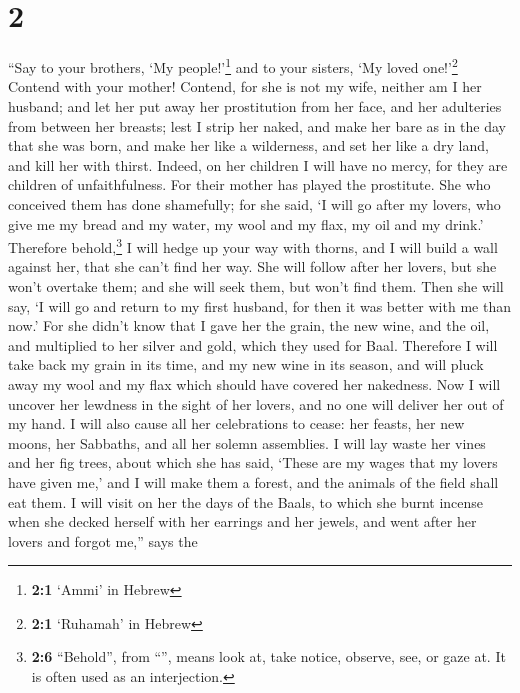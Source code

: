 \hypertarget{section-1}{%
\section{2}\label{section-1}}

 ``Say to your brothers, `My people!'\footnote{\textbf{2:1}
  `Ammi' in Hebrew} and to your sisters, `My loved one!'\footnote{\textbf{2:1}
  `Ruhamah' in Hebrew}  Contend with your mother! Contend,
for she is not my wife, neither am I her husband; and let her put away
her prostitution from her face, and her adulteries from between her
breasts;  lest I strip her naked, and make her bare as in
the day that she was born, and make her like a wilderness, and set her
like a dry land, and kill her with thirst.  Indeed, on her
children I will have no mercy, for they are children of unfaithfulness.
 For their mother has played the prostitute. She who
conceived them has done shamefully; for she said, `I will go after my
lovers, who give me my bread and my water, my wool and my flax, my oil
and my drink.'  Therefore behold,\footnote{\textbf{2:6}
  ``Behold'', from ``'', means look at, take notice,
  observe, see, or gaze at. It is often used as an interjection.} I will
hedge up your way with thorns, and I will build a wall against her, that
she can't find her way.  She will follow after her lovers,
but she won't overtake them; and she will seek them, but won't find
them. Then she will say, `I will go and return to my first husband, for
then it was better with me than now.'  For she didn't know
that I gave her the grain, the new wine, and the oil, and multiplied to
her silver and gold, which they used for Baal.  Therefore
I will take back my grain in its time, and my new wine in its season,
and will pluck away my wool and my flax which should have covered her
nakedness.  Now I will uncover her lewdness in the sight
of her lovers, and no one will deliver her out of my hand.
 I will also cause all her celebrations to cease: her
feasts, her new moons, her Sabbaths, and all her solemn assemblies.
 I will lay waste her vines and her fig trees, about
which she has said, `These are my wages that my lovers have given me,'
and I will make them a forest, and the animals of the field shall eat
them.  I will visit on her the days of the Baals, to
which she burnt incense when she decked herself with her earrings and
her jewels, and went after her lovers and forgot me,'' says the
